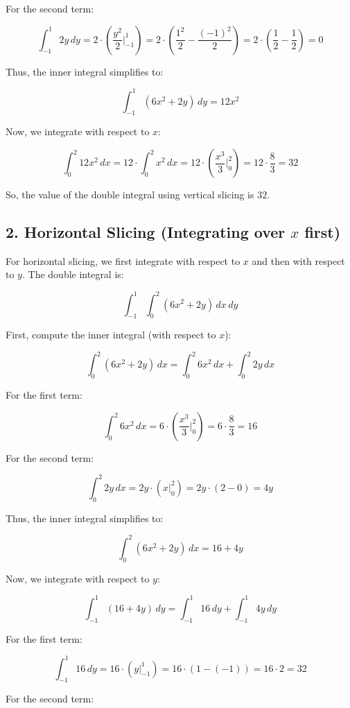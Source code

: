 \documentclass[11pt]{article}
\begin{document}
For the second term:

\[
\int_{-1}^1 2y \, dy = 2 \cdot \left( \frac{y^2}{2} \bigg|_{-1}^1 \right) = 2 \cdot \left( \frac{1^2}{2} - \frac{(-1)^2}{2} \right) = 2 \cdot ( \frac{1}{2} - \frac{1}{2} ) = 0
\]

Thus, the inner integral simplifies to:

\[
\int_{-1}^1 (6x^2 + 2y) \, dy = 12x^2
\]

Now, we integrate with respect to \(x\):

\[
\int_0^2 12x^2 \, dx = 12 \cdot \int_0^2 x^2 \, dx = 12 \cdot \left( \frac{x^3}{3} \bigg|_0^2 \right) = 12 \cdot \frac{8}{3} = 32
\]

So, the value of the double integral using vertical slicing is \( 32 \).

\newpage

\subsection{2. Horizontal Slicing (Integrating over \(x\) first)}

For horizontal slicing, we first integrate with respect to \(x\) and then with respect to \(y\). The double integral is:

\[
\int_{-1}^1 \int_0^2 (6x^2 + 2y) \, dx \, dy
\]

First, compute the inner integral (with respect to \(x\)):

\[
\int_0^2 (6x^2 + 2y) \, dx = \int_0^2 6x^2 \, dx + \int_0^2 2y \, dx
\]

For the first term:

\[
\int_0^2 6x^2 \, dx = 6 \cdot \left( \frac{x^3}{3} \bigg|_0^2 \right) = 6 \cdot \frac{8}{3} = 16
\]

For the second term:

\[
\int_0^2 2y \, dx = 2y \cdot (x \bigg|_0^2) = 2y \cdot (2 - 0) = 4y
\]

Thus, the inner integral simplifies to:

\[
\int_0^2 (6x^2 + 2y) \, dx = 16 + 4y
\]

Now, we integrate with respect to \(y\):

\[
\int_{-1}^1 (16 + 4y) \, dy = \int_{-1}^1 16 \, dy + \int_{-1}^1 4y \, dy
\]

For the first term:

\[
\int_{-1}^1 16 \, dy = 16 \cdot (y \bigg|_{-1}^1) = 16 \cdot (1 - (-1)) = 16 \cdot 2 = 32
\]

For the second term:
\end{document}
